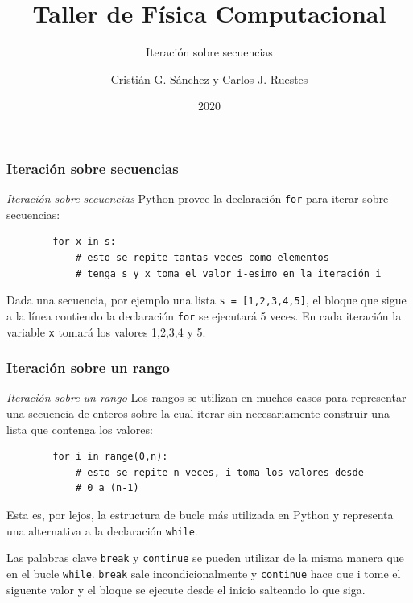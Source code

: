 \documentclass{beamer}
\title{Taller de Física Computacional}
\subtitle{Iteración sobre secuencias}
\author{Cristián G. Sánchez y Carlos J. Ruestes}
\date{2020}
\begin{document}
\frame{\titlepage}

\begin{frame}[fragile]
    \frametitle{Iteración sobre secuencias}
    \begin{block}{{\em Iteración sobre secuencias}}
    Python provee la declaración \texttt{for} para iterar sobre secuencias:
    \begin{verbatim}
        for x in s:
            # esto se repite tantas veces como elementos
            # tenga s y x toma el valor i-esimo en la iteración i
    \end{verbatim}
    Dada una secuencia, por ejemplo una lista \texttt{s = [1,2,3,4,5]}, el bloque que sigue a la línea contiendo la declaración \texttt{for}
    se ejecutará 5 veces. En cada iteración la variable \texttt{x} tomará los valores 1,2,3,4 y 5. 
    \end{block}
\end{frame}

\begin{frame}[fragile]
    \frametitle{Iteración sobre un rango}
    \begin{block}{{\em Iteración sobre un rango}}
    Los rangos se utilizan en muchos casos para representar una secuencia de enteros sobre la cual iterar sin necesariamente construir una lista que contenga los valores:
    \begin{verbatim}
        for i in range(0,n):
            # esto se repite n veces, i toma los valores desde
            # 0 a (n-1)
    \end{verbatim}
    Esta es, por lejos, la estructura de bucle más utilizada en Python y representa una alternativa a la declaración \texttt{while}.
    \end{block}
    Las palabras clave \texttt{break} y \texttt{continue} se pueden utilizar de la misma manera que en el bucle \texttt{while}.
    \texttt{break} sale incondicionalmente y \texttt{continue} hace que i tome el siguente valor y el bloque se ejecute desde el inicio salteando lo
    que siga.
\end{frame}
\end{document}
